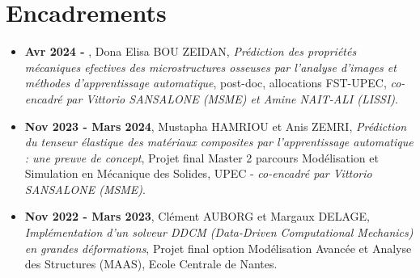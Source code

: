 \documentclass[french]{article}
\begin{document}
\section*{Encadrements}
\begin{itemize} 
\item \textbf{Avr 2024 - }, Dona Elisa BOU ZEIDAN, \textit{Prédiction des propriétés mécaniques efectives des microstructures osseuses par l'analyse d'images et méthodes d’apprentissage automatique}, post-doc, allocations FST-UPEC, \textit{co-encadré par Vittorio SANSALONE (MSME) et  Amine NAIT-ALI (LISSI)}. 
\item \textbf{Nov 2023 - Mars 2024}, Mustapha HAMRIOU et Anis ZEMRI, \textit{Prédiction du tenseur élastique des matériaux composites par l’apprentissage automatique : une preuve de concept}, Projet final Master 2 parcours Modélisation et Simulation en Mécanique des Solides, UPEC - \textit{co-encadré par Vittorio SANSALONE (MSME)}.
\item \textbf{Nov 2022 - Mars 2023}, Clément AUBORG et Margaux DELAGE, \textit{Implémentation d’un solveur DDCM (Data-Driven Computational Mechanics) en grandes déformations}, Projet final option Modélisation Avancée et Analyse des Structures (MAAS), Ecole Centrale de Nantes.
\end{itemize}
\end{document}
